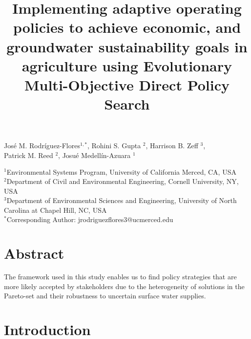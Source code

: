 \documentclass[11pt,a4paper]{article}
\title{Implementing adaptive operating policies to achieve economic, and groundwater sustainability goals in agriculture using Evolutionary Multi-Objective Direct Policy Search}
\date{}
\begin{document}
\maketitle

\vspace{-3cm}

\begin{center}
José M. Rodríguez-Flores$^{1,*}$, Rohini S. Gupta $^2$, Harrison B. Zeff $^3$,\\ Patrick M. Reed $^2$, Josué Medellín-Azuara $^1$\\
\end{center}

\begin{center}
\small
$^1$Environmental Systems Program, University of California Merced, CA, USA\\
$^2$Department of Civil and Environmental Engineering, Cornell University, NY, USA\\
$^3$Department of Environmental Sciences and Engineering, University of North Carolina at Chapel Hill, NC, USA\\
$^*$Corresponding Author: jrodriguezflores3@ucmerced.edu
\end{center}


\section*{Abstract}

The framework used in this study enables us to find policy strategies that are more likely accepted by stakeholders due to the heterogeneity of solutions in the Pareto-set and their robustness to uncertain surface water supplies. 
 
\section{Introduction}
\end{document}

